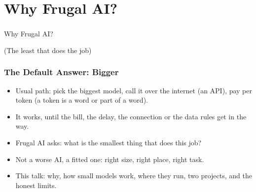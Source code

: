 
\section[Why]{Why Frugal AI?}

\begin{frame}[fragile]\frametitle{}
\begin{center}
{\Large Why Frugal AI?}

\medskip
{\small (The least that does the job)}
\end{center}
\end{frame}

\begin{frame}[fragile]\frametitle{The Default Answer: Bigger}
\begin{itemize}
\item Usual path: pick the biggest model, call it over the internet (an API), pay per token (a token is a word or part of a word).
\item It works, until the bill, the delay, the connection or the data rules get in the way.
\item Frugal AI asks: what is the smallest thing that does this job?
\item Not a worse AI, a fitted one: right size, right place, right task.
\item This talk: why, how small models work, where they run, two projects, and the honest limits.
\end{itemize}
\end{frame}

